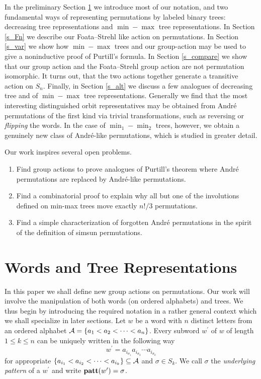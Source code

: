 In the preliminary Section \ref{s_words} we introduce most of our
notation, and two fundamental ways of representing permutations by
labeled binary trees: decreasing tree representations and
$\min-\max$ tree representations. In Section \ref{s_Fn} we describe  
our Foata--Strehl like action on permutations. In Section \ref{s_var} we show
how $\min-\max$ trees and our group-action may be used to give a
noninductive proof of Purtill's formula. In Section \ref{s_compare} we
show that our group action and the Foata--Strehl group action are not
permutation isomorphic. It turns out, that the two actions together generate a
transitive action on $S_n$. Finally, in Section \ref{s_alt} we discuss a
few analogues of decreasing tree and of $\min-\max$ tree
representations. Generally we find that the most interesting
distinguished orbit representatives may be obtained from Andr\'e
permutations of the first kind via trivial transformations, such as
reversing or {\em flipping} the words. In the case of $\min_1-\min_2$
trees, however, we obtain a genuinely new class of Andr\'e-like
permutations, which is studied in greater detail.  

Our work inspires several open problems.
\begin{enumerate}
\item Find group actions to prove analogues of Purtill's theorem
where Andr\'e permutations are replaced by Andr\'e-like
permutations.

\item Find a combinatorial proof to explain why all but one of the
involutions defined on min-max trees move exactly $n!/3$ permutations.

\item Find a simple characterization of forgotten Andr\'e permutations
in the spirit of the definition of simsun permutations.
\end{enumerate} 

\section{Words and Tree Representations}
\label{s_words}

In this paper we shall define new group actions on permutations.
Our work will involve the manipulation of both words (on ordered alphabets)
and trees.
We thus begin by introducing the required notation in a rather general
context which we shall specialize in later sections.
Let $w$ be a word with $n$ distinct letters from an ordered
alphabet ${\cal A} = \{ a_1 < a_2 < \cdots < a_n\}$. 
Every subword  $w^\prime$ of $w$   of length $1 \le k \le n$  can be
uniquely written in the following way 
$$
w^\prime = a_{i_{\sigma_1}}a_{i_{\sigma_2}}\cdots a_{i_{\sigma_k}}
$$ 
for appropriate 
$ \{ a_{i_1} < a_{i_2} < \cdots < a_{i_k} \} \subseteq {\cal A}$
and $\sigma \in S_k$.
We call $\sigma$ the  {\em underlying pattern} of a $w^\prime$ and write
${\bf patt}(w^\prime) = \sigma$.

